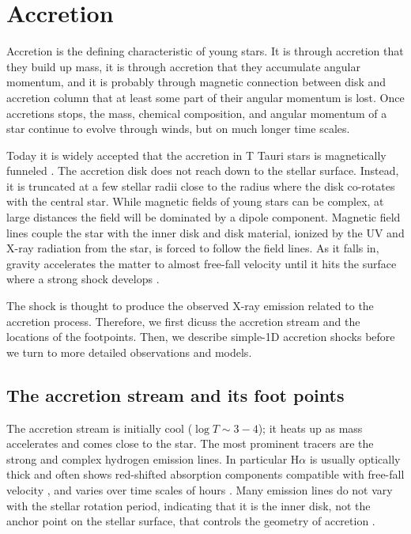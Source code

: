 


\section{Accretion \label{sect:accretion}}

Accretion is the defining characteristic of young stars. It is through accretion that they build up mass, it is through accretion that they accumulate angular momentum, and it is probably through magnetic connection between disk and accretion column that at least some part of their angular momentum is lost. Once accretions stops, the mass, chemical composition, and angular momentum of a star continue to evolve through winds, but on much longer time scales.

Today it is widely accepted that the accretion in T Tauri stars is magnetically funneled \citep{Hartmann_2016}. The accretion disk does not reach down to the stellar surface. Instead, it is truncated at a few stellar radii close to the radius where the disk co-rotates with the central star. While magnetic fields of young stars can be complex, at large distances the field will be dominated by a dipole component. Magnetic field lines couple the star with the inner disk and disk material, ionized by the UV and X-ray radiation from the star, is forced to follow the field lines. As it falls in, gravity accelerates the matter to almost free-fall velocity until it hits the surface where a strong shock develops \cite{Shu_1994}. 

The shock is thought to produce the observed X-ray emission related to the accretion process. Therefore, we first dicuss the accretion stream and the locations of the footpoints. Then, we describe simple-1D accretion shocks  before we turn to more detailed observations and models.

\subsection{The accretion stream and its foot points}
\label{sect:accretionsrteam}
The accretion stream is initially cool ($\log T\sim3-4$); it heats up as mass accelerates and comes close to the star. The most prominent tracers are the strong and complex hydrogen emission lines. In particular H$\alpha$ is usually optically thick and often shows red-shifted absorption components compatible with free-fall velocity \cite[e.g.][]{2000AJ....119.1881A}, and varies over time scales of hours \cite{dupree_2012}. Many emission lines do not vary with the stellar rotation period, indicating that it is the inner disk, not the anchor point on the stellar surface, that controls the geometry of accretion \cite{2021A&A...649A..68S}.



